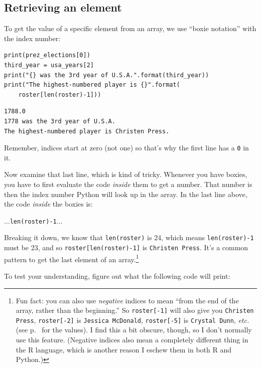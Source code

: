 \subsection{Retrieving an element}

To get the value of a specific element from an array, we use ``boxie notation''
with the index number:

\begin{Verbatim}[fontsize=\small,samepage=true,frame=single,framesep=3mm]
print(prez_elections[0])
third_year = usa_years[2]
print("{} was the 3rd year of U.S.A.".format(third_year))
print("The highest-numbered player is {}".format(
    roster[len(roster)-1]))
\end{Verbatim}

\begin{Verbatim}[fontsize=\small,samepage=true,frame=leftline,framesep=5mm,framerule=1mm]
1788.0
1778 was the 3rd year of U.S.A.
The highest-numbered player is Christen Press.
\end{Verbatim}

Remember, indices start at zero (not one) so that's why the first line has a
\texttt{0} in it.

Now examine that last line, which is kind of tricky. Whenever you have boxies,
you have to first evaluate the code \textit{inside} them to get a number. That
number is then the index number Python will look up in the array. In the last
line above, the code \textit{inside} the boxies is:

\quad\quad\quad   ...\texttt{len(roster)-1}...

Breaking it down, we know that \texttt{len(roster)} is 24, which means
\texttt{len(roster)-1} must be 23, and so \texttt{roster[len(roster)-1]} is
\texttt{Christen Press}. It's a common pattern to get the last element of an
array.\footnote{Fun fact: you can also use \textit{negative} indices to mean
``from the end of the array, rather than the beginning.'' So
\texttt{roster[-1]} will also give you \texttt{Christen Press},
\texttt{roster[-2]} is \texttt{Jessica McDonald},
\texttt{roster[-5]} is \texttt{Crystal Dunn}, \textit{etc.} (see
p.~\pageref{rosterNames} for the values). I find this a bit obscure, though, so
I don't normally use this feature. (Negative indices also mean a completely
different thing in the R language, which is another reason I eschew them in
both R and Python.)}

To test your understanding, figure out what the following code will print:

